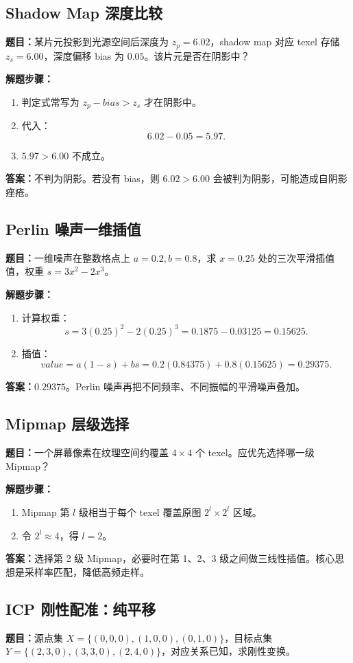 \documentclass[UTF8,zihao=-4,scheme=chinese,fontset=fandol]{ctexart}
\begin{document}
\subsection{Shadow Map 深度比较}
\textbf{题目：}某片元投影到光源空间后深度为 $z_p=6.02$，shadow map 对应 texel 存储 $z_s=6.00$，深度偏移 bias 为 $0.05$。该片元是否在阴影中？

\textbf{解题步骤：}
\begin{enumerate}
  \item 判定式常写为 $z_p-bias>z_s$ 才在阴影中。
  \item 代入：
  \[
  6.02-0.05=5.97.
  \]
  \item $5.97>6.00$ 不成立。
\end{enumerate}
\textbf{答案：}不判为阴影。若没有 bias，则 $6.02>6.00$ 会被判为阴影，可能造成自阴影痤疮。

\subsection{Perlin 噪声一维插值}
\textbf{题目：}一维噪声在整数格点上 $a=0.2,b=0.8$，求 $x=0.25$ 处的三次平滑插值值，权重 $s=3x^2-2x^3$。

\textbf{解题步骤：}
\begin{enumerate}
  \item 计算权重：
  \[
  s=3(0.25)^2-2(0.25)^3=0.1875-0.03125=0.15625.
  \]
  \item 插值：
  \[
  value=a(1-s)+bs=0.2(0.84375)+0.8(0.15625)=0.29375.
  \]
\end{enumerate}
\textbf{答案：}$0.29375$。Perlin 噪声再把不同频率、不同振幅的平滑噪声叠加。

\subsection{Mipmap 层级选择}
\textbf{题目：}一个屏幕像素在纹理空间约覆盖 $4\times4$ 个 texel。应优先选择哪一级 Mipmap？

\textbf{解题步骤：}
\begin{enumerate}
  \item Mipmap 第 $l$ 级相当于每个 texel 覆盖原图 $2^l\times2^l$ 区域。
  \item 令 $2^l\approx4$，得 $l=2$。
\end{enumerate}
\textbf{答案：}选择第 2 级 Mipmap，必要时在第 1、2、3 级之间做三线性插值。核心思想是采样率匹配，降低高频走样。

\subsection{ICP 刚性配准：纯平移}
\textbf{题目：}源点集 $X=\{(0,0,0),(1,0,0),(0,1,0)\}$，目标点集 $Y=\{(2,3,0),(3,3,0),(2,4,0)\}$，对应关系已知，求刚性变换。
\end{document}
